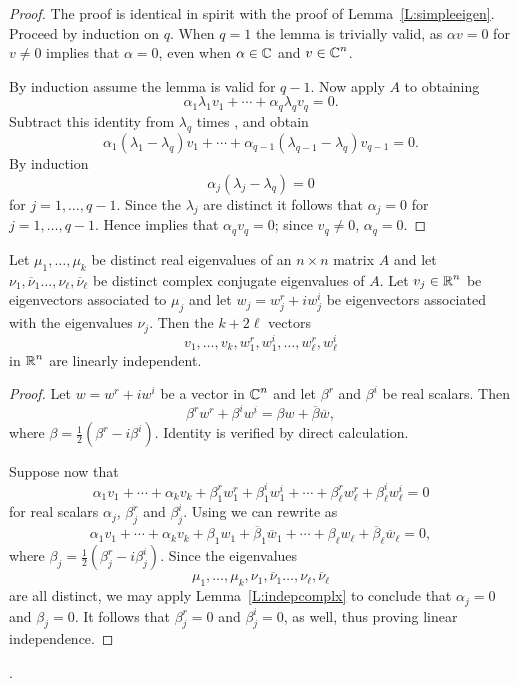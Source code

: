 \documentclass{ximera}
\begin{document}
\begin{proof}  The proof is identical in spirit with the proof of 
Lemma~\ref{L:simpleeigen}.  Proceed by induction on $q$.  When $q=1$ the
lemma is trivially valid, as $\alpha v=0$ for $v\neq 0$ implies that
$\alpha=0$, even when $\alpha\in\mbox{$\Bbb{C}$}$ and $v\in\mbox{$\Bbb{C}$}^n$.  

By induction assume the lemma is valid for $q-1$.  Now apply $A$ to 
 obtaining
\[
\alpha_1\lambda_1v_1 + \cdots + \alpha_q\lambda_qv_q = 0.
\]
Subtract this identity from $\lambda_q$ times , and obtain
\[
\alpha_1(\lambda_1-\lambda_q)v_1 + \cdots +
\alpha_{q-1}(\lambda_{q-1}-\lambda_q)v_{q-1} = 0.
\]
By induction 
\[
\alpha_j(\lambda_j-\lambda_q) = 0
\]
for $j=1,\ldots, q-1$.  Since the $\lambda_j$ are distinct it follows that 
$\alpha_j=0$ for $j=1,\ldots, q-1$.  Hence  implies that 
$\alpha_qv_q = 0$; since $v_q\neq 0$, $\alpha_q=0$.  \end{proof}

\begin{lemma}  \label{L:rlcmplx}
Let $\mu_1,\ldots,\mu_k$ be distinct real eigenvalues of an $n\times n$ 
matrix $A$ and let $\nu_1,\overline{\nu}_1\ldots,\nu_\ell,\overline{\nu}_\ell$
be distinct complex conjugate eigenvalues of $A$.  Let $v_j\in\mbox{$\Bbb{R}$}^n$ be
eigenvectors associated to $\mu_j$ and let $w_j=w_j^r+iw_j^i$ be eigenvectors
associated with the eigenvalues $\nu_j$.  Then the $k+2\ell$ vectors 
\[
v_1,\ldots,v_k,w_1^r,w_1^i,\ldots,w_\ell^r,w_\ell^i
\]
in $\mbox{$\Bbb{R}$}^n$ are linearly independent.
\end{lemma}

\begin{proof}  Let $w=w^r+iw^i$ be a vector in $\mbox{$\Bbb{C}$}^n$ and let $\beta^r$ and
$\beta^i$ be real scalars.  Then 
\begin{equation}  \label{E:realcmplx}
\beta^rw^r + \beta^iw^i = \beta w + \overline{\beta} \overline{w},
\end{equation}
where $\beta = \frac{1}{2}(\beta^r-i\beta^i)$.  Identity  
is verified by direct calculation.

Suppose now that 
\begin{equation}  \label{E:rlcplxlc} 
\alpha_1v_1+\cdots+\alpha_kv_k + \beta_1^rw_1^r+\beta_1^iw_1^i + \cdots +
\beta_\ell^rw_\ell^r+\beta_\ell^iw_\ell^i = 0
\end{equation}
for real scalars $\alpha_j$, $\beta_j^r$ and $\beta_j^i$.  Using 
 we can rewrite  as
\[
\alpha_1v_1+\cdots+\alpha_kv_k + \beta_1w_1+\overline{\beta}_1\overline{w}_1 
+ \cdots + \beta_\ell w_\ell+\overline{\beta}_\ell\overline{w}_\ell = 0,
\]
where $\beta_j = \frac{1}{2}(\beta_j^r-i\beta_j^i)$.  Since the eigenvalues 
\[
\mu_1,\ldots,\mu_k,\nu_1,\overline{\nu}_1\ldots,\nu_\ell,\overline{\nu}_\ell
\]
are all distinct, we may apply Lemma~\ref{L:indepcomplx} to conclude that 
$\alpha_j=0$ and $\beta_j=0$.  It follows that $\beta_j^r=0$ and
$\beta_j^i=0$, as well, thus proving linear independence.  \end{proof}. 
\end{document}
